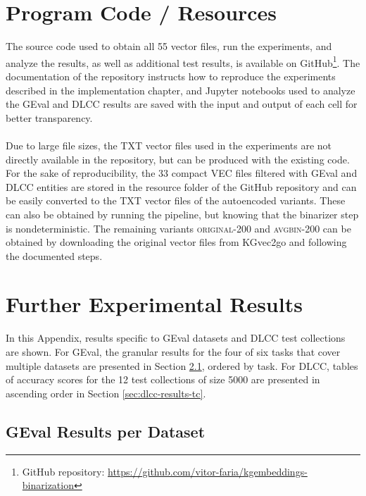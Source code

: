 \documentclass[11pt,titlepage,oneside,openany]{book}
\begin{document}




\appendix

\chapter{Program Code / Resources}
\label{cha:appendix-a}

The source code used to obtain all 55 vector files, run the experiments, and analyze the results, as well as additional test results, is available on GitHub\footnote{GitHub repository: \hyperlink{https://github.com/vitor-faria/kgembeddings-binarization}{https://github.com/vitor-faria/kgembeddings-binarization}}. The documentation of the repository instructs how to reproduce the experiments described in the implementation chapter, and Jupyter notebooks used to analyze the GEval and DLCC results are saved with the input and output of each cell for better transparency.\\
\\
Due to large file sizes, the TXT vector files used in the experiments are not directly available in the repository, but can be produced with the existing code. For the sake of reproducibility, the 33 compact VEC files filtered with GEval and DLCC entities are stored in the resource folder of the GitHub repository and can be easily converted to the TXT vector files of the autoencoded variants. These can also be obtained by running the pipeline, but knowing that the binarizer step is nondeterministic. The remaining variants \textsc{original-200} and \textsc{avgbin-200} can be obtained by downloading the original vector files from KGvec2go and following the documented steps.

\chapter{Further Experimental Results}
\label{cha:appendix-b}

In this Appendix, results specific to GEval datasets and DLCC test collections are shown. For GEval, the granular results for the four of six tasks that cover multiple datasets are presented in Section \ref{sec:geval-results-dataset}, ordered by task. For DLCC, tables of accuracy scores for the 12 test collections of size 5000 are presented in ascending order in Section \ref{sec:dlcc-results-tc}.

\section{GEval Results per Dataset}
\label{sec:geval-results-dataset}
\end{document}

